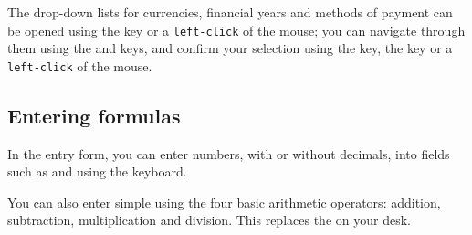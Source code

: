The drop-down lists for currencies, financial years and methods of payment can be opened using the  key or a \texttt{left-click} of the mouse; you can navigate through them using the \keys{\arrowkeyup} and \keys{\arrowkeydown} keys, and confirm your selection using the  key, the  key or a \texttt{left-click} of the mouse.


\subsection{Entering formulas\label{transactions-new-numbers}}

In the entry form, you can enter numbers, with or without decimals, into fields such as  and  using the keyboard.

You can also enter simple  using the four basic arithmetic operators: addition, subtraction, multiplication and division. This replaces the  on your desk.

